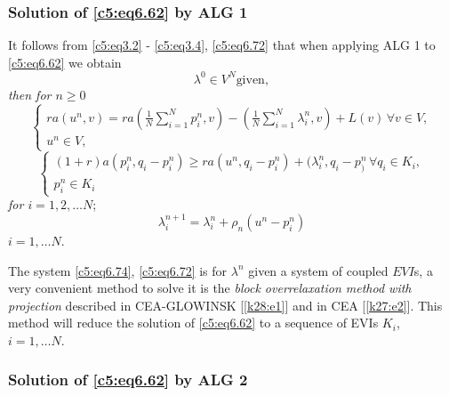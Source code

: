 \subsubsection{Solution of \eqref{c5:eq6.62} by ALG 
1}\label{c5:sss6.5.3} 

It follows from \eqref{c5:eq3.2} - \eqref{c5:eq3.4}, \eqref{c5:eq6.72} 
that when applying ALG 1 to \eqref{c5:eq6.62} we obtain  
\begin{equation}
\lambda^0 \in V^N \text{given}, \tag{6.73}\label{c5:eq6.73}
\end{equation} 
\textit{then for $n \geq 0$}
\begin{equation}
\begin{cases}
ra (u^n, v) = ra (\frac{1}{N} \sum^N_{i=1} p^n_i, v) - (\frac{1}{N} 
\sum^N_{i=1}\lambda^n_i,  v) + L (v)\, \forall v \in V,\\ 
u^n \in V, \tag{6.74}\label{c5:eq6.74}
\end{cases}
\end{equation}
\begin{equation}
\begin{cases}
(1+r) a (p^n_i, q_i-p^n_i) \geq ra (u^n, q_i-p^n_i) + (\lambda^n_i ,  
q_i -p^n_)\, \forall q_i \in K_i, \\ 
p^n_i \in K_i\tag{6.75}\label{c5:eq6.75}
\end{cases}
\end{equation}\pageoriginale  
 \textit{for $i=1, 2, \ldots N $};
 \begin{equation}
 \lambda^{n+1}_i = \lambda^n_i + \rho_n (u^n-p_i^n)\tag{6.76}\label{c5:eq6.76}
 \end{equation} 
 \textit{$i=1, \ldots N $}.
 
\noindent
 The system \eqref{c5:eq6.74}, \eqref{c5:eq6.72} is for $\lambda^n$ 
 given a system of coupled $EVI$s, a very convenient  method to solve 
 it is  the \textit{block overrelaxation method with projection} 
 described in CEA-GLOWINSK [\ref{k28:e1}] and in CEA [\ref{k27:e2}].
 This  method will  
 reduce the solution of \eqref{c5:eq6.62} to a sequence of EVIs $K_i$, 
 $i=1, \ldots N$.       
 
 \subsubsection{Solution of \eqref{c5:eq6.62} by ALG 
 2}\label{c5:sss6.5.4}%
 
